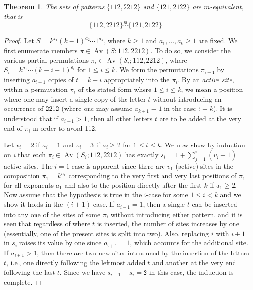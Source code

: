 \documentclass[11pt]{amsart}
\theoremstyle{plain}
\newtheorem{theorem}{Theorem}[section]
\theoremstyle{definition}
\newcommand{\msim}{\stackrel{m}{\sim}}
\DeclareMathOperator{\Av}{Av}
\begin{document}
\begin{theorem}\label{112,2212}
The sets of patterns $\{112,2212\}$ and $\{121,2122\}$ are $m$-equivalent, that is
$$\{112,2212\}\msim\{121,2122\}.$$
\end{theorem}
\begin{proof}
Let $S=k^{a_1}(k-1)^{a_2}\cdots 1^{a_k}$, where $k \geq 1$ and $a_1,\ldots,a_k \geq 1$ are fixed.
We first enumerate members $\pi \in \Av(S;112,2212)$.  To do so, we consider the various partial
permutations $\pi_i \in \Av(S_i;112,2212)$, where $S_i=k^{a_1}\cdots (k-i+1)^{a_i}$ for $1 \leq
i \leq k$.  We form the permutations $\pi_{i+1}$ by inserting $a_{i+1}$ copies of $t=k-i$
appropriately into the $\pi_i$.  By an \emph{active site}, within a permutation $\pi_i$ of the stated
form where $1 \leq i \leq k$, we mean a position where one may insert a single copy of the letter $t$
without introducing an occurrence of 2212 (where one may assume $a_{k+1}=1$ in the case $i=k$).  It
is understood that if $a_{i+1}>1$, then all other letters $t$ are to be added at the very end of
$\pi_i$ in order to avoid 112.

Let $v_i=2$ if $a_i=1$ and $v_i=3$ if $a_i\geq 2$ for $1 \leq i \leq k$. We now show by induction on
$i$ that each $\pi_i \in \Av(S_i;112,2212)$ has exactly $s_i=1+\sum_{j=1}^i(v_j-1)$ active sites.
The $i=1$ case is apparent since there are $v_1$ (active) sites in the composition $\pi_1=k^{a_1}$
corresponding to the very first and very last positions of $\pi_1$ for all exponents $a_1$ and also
to the position directly after the first $k$ if $a_1\geq 2$.  Now assume that the hypothesis is true
in the $i$-case for some $1 \leq i<k$ and we show it holds in the $(i+1)$-case.  If $a_{i+1}=1$, then
a single $t$ can be inserted into any one of the sites of some $\pi_i$ without introducing either
pattern, and it is seen that regardless of where $t$ is inserted, the number of sites increases by
one (essentially,
one of the present sites is split into two).  Also, replacing $i$ with $i+1$ in $s_i$ raises its
value by one since $a_{i+1}=1$, which accounts for the additional site.  If $a_{i+1}>1$, then there
are two new sites introduced by the insertion of the letters $t$, i.e., one directly following the
leftmost added $t$ and another at the very end following the last $t$.  Since we have $s_{i+1}-s_i=2$
in this case, the induction is complete.


\end{proof}
\end{document}
